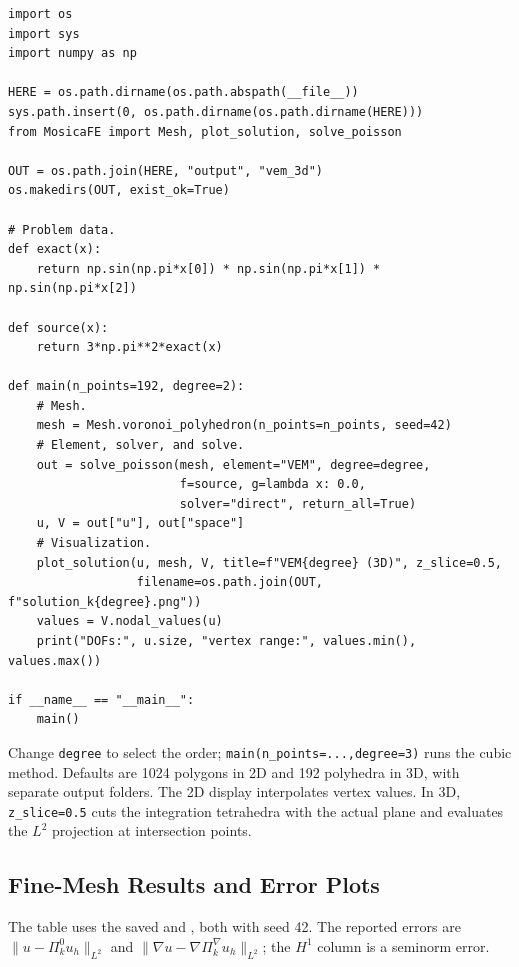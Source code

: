 \documentclass[11pt,oneside]{book}
\theoremstyle{definition}
\theoremstyle{plain}
\newcommand{\code}[1]{\texttt{#1}}
\begin{document}
\begin{lstlisting}[language=MosicaFE,caption={Standalone 3D main program}]
import os
import sys
import numpy as np

HERE = os.path.dirname(os.path.abspath(__file__))
sys.path.insert(0, os.path.dirname(os.path.dirname(HERE)))
from MosicaFE import Mesh, plot_solution, solve_poisson

OUT = os.path.join(HERE, "output", "vem_3d")
os.makedirs(OUT, exist_ok=True)

# Problem data.
def exact(x):
    return np.sin(np.pi*x[0]) * np.sin(np.pi*x[1]) * np.sin(np.pi*x[2])

def source(x):
    return 3*np.pi**2*exact(x)

def main(n_points=192, degree=2):
    # Mesh.
    mesh = Mesh.voronoi_polyhedron(n_points=n_points, seed=42)
    # Element, solver, and solve.
    out = solve_poisson(mesh, element="VEM", degree=degree,
                        f=source, g=lambda x: 0.0,
                        solver="direct", return_all=True)
    u, V = out["u"], out["space"]
    # Visualization.
    plot_solution(u, mesh, V, title=f"VEM{degree} (3D)", z_slice=0.5,
                  filename=os.path.join(OUT, f"solution_k{degree}.png"))
    values = V.nodal_values(u)
    print("DOFs:", u.size, "vertex range:", values.min(), values.max())

if __name__ == "__main__":
    main()
\end{lstlisting}

Change \code{degree} to select the order; \code{main(n\_\allowbreak points=...,\allowbreak  degree=3)} runs
the cubic method. Defaults are 1024 polygons in 2D and 192 polyhedra in 3D, with
separate output folders. The 2D display interpolates vertex values. In 3D,
\code{z\_\allowbreak slice=0.5} cuts the integration tetrahedra with the actual plane and evaluates
the $L^2$ projection at intersection points.
\subsection{Fine-Mesh Results and Error Plots}
\label{sec:vem-fine-results}
The table uses the saved  and
, both with seed 42.
The reported errors are $\|u-\Pi_k^0u_h\|_{L^2}$ and
$\|\nabla u-\nabla\Pi_k^\nabla u_h\|_{L^2}$; the $H^1$ column is a seminorm error.
\end{document}
